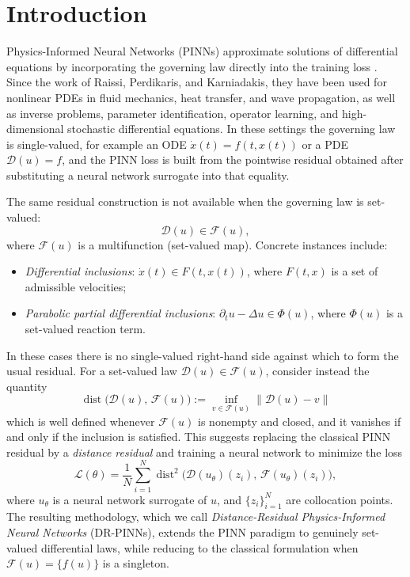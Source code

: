 \documentclass[11pt]{elsarticle}
\theoremstyle{definition}
\theoremstyle{remark}
\numberwithin{equation}{section}
\def\dist{\operatorname{dist}}
\begin{document}
	\tableofcontents
	\newpage
	
	\section{Introduction}
	\label{sec:intro}
	
	Physics-Informed Neural Networks (PINNs) approximate solutions of
	differential equations by incorporating the governing law directly into
	the training loss \cite{raissi2019}. Since the work of Raissi,
	Perdikaris, and Karniadakis, they have been used for nonlinear PDEs in
	fluid mechanics, heat transfer, and wave propagation, as well as inverse
	problems, parameter identification, operator learning, and
	high-dimensional stochastic differential equations. In these settings the
	governing law is single-valued, for example an ODE
	$\dot{x}(t)=f(t,x(t))$ or a PDE $\mathcal{D}(u)=f$, and the PINN loss is
	built from the pointwise residual obtained after substituting a neural
	network surrogate into that equality.
	
	The same residual construction is not available when the governing law is
	set-valued:
	\[
	\mathcal{D}(u) \in \mathcal{F}(u),
	\]
	where $\mathcal{F}(u)$ is a multifunction (set-valued map).  Concrete
	instances include:
	\begin{itemize}
		\item \emph{Differential inclusions}: $\dot{x}(t)\in F(t,x(t))$,
		where $F(t,x)$ is a set of admissible velocities;
		\item \emph{Parabolic partial differential inclusions}:
		$\partial_t u - \Delta u \in \Phi(u)$, where $\Phi(u)$ is a
		set-valued reaction term.
	\end{itemize}
	In these cases there is no single-valued right-hand side against which to
	form the usual residual. For a set-valued law
	$\mathcal{D}(u)\in\mathcal{F}(u)$, consider instead the quantity
	\[
	\dist\bigl(\mathcal{D}(u),\,\mathcal{F}(u)\bigr)
	:= \inf_{v\in \mathcal{F}(u)} \|\mathcal{D}(u) - v \|
	\]
	which is well defined whenever $\mathcal{F}(u)$ is nonempty and
	closed, and it vanishes if and only if the inclusion is satisfied.  This
	suggests replacing the classical PINN residual by a \emph{distance
		residual} and training a neural network to minimize the loss
	\[
	\mathcal{L}(\theta)
	=
	\frac{1}{N}\sum_{i=1}^{N}
	\dist^2\bigl(\mathcal{D}(u_\theta)(z_i),\,
	\mathcal{F}(u_\theta)(z_i)\bigr),
	\]
	where $u_\theta$ is a neural network surrogate of $u$, and $\{z_i\}_{i=1}^N$ are collocation points.  The resulting methodology, which
	we call \emph{Distance-Residual Physics-Informed Neural Networks}
	(DR-PINNs), extends the PINN paradigm to genuinely set-valued
	differential laws, while reducing to the classical formulation when
	$\mathcal{F}(u)=\{f(u)\}$ is a singleton.
	
\end{document}
